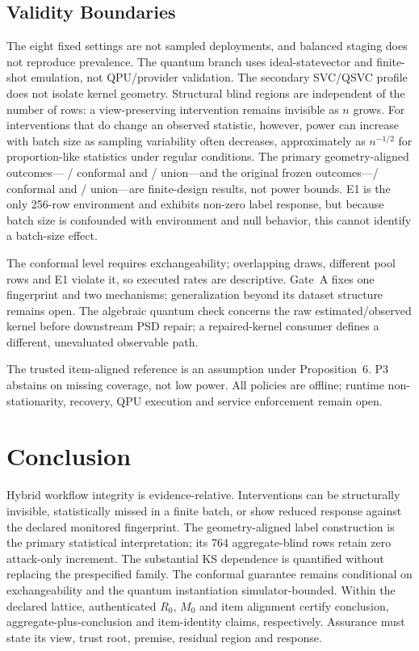 \documentclass[10pt,journal,compsoc]{IEEEtran}
\begin{document}
\subsection{Validity Boundaries}

The eight fixed settings are not sampled deployments, and balanced staging
does not reproduce prevalence. The quantum branch uses ideal-statevector and
finite-shot emulation, not QPU/provider validation. The secondary SVC/QSVC
profile does not isolate kernel geometry. Structural blind regions are
independent of the number of rows: a view-preserving intervention remains
invisible as $n$ grows. For interventions that do change an observed statistic,
however, power can increase with batch size as sampling variability often
decreases, approximately as $n^{-1/2}$ for proportion-like statistics under
regular conditions. The primary geometry-aligned outcomes---
\AlignedLabelFamilyFires{}/\AlignedLabelMaterialDen{} conformal and
\AlignedLabelUnionFires{}/\AlignedLabelMaterialDen{} union---and the original
frozen outcomes---\BatchFamilyLabelFires{}/\NMaterialLabel{} conformal and
\BatchUnionLabelFires{}/\NMaterialLabel{} union---are finite-design results,
not power bounds. E1 is the
only 256-row environment and exhibits non-zero label response, but because
batch size is confounded with environment and null behavior, this cannot
identify a batch-size effect.

The conformal level requires exchangeability; overlapping draws, different
pool rows and E1 violate it, so executed rates are descriptive. Gate~A fixes
one fingerprint and two mechanisms; generalization beyond its dataset
structure remains open. The algebraic quantum check concerns the raw
estimated/observed kernel before downstream PSD repair; a repaired-kernel
consumer defines a different, unevaluated observable path.

The trusted item-aligned reference is an assumption under Proposition~6. P3
abstains on missing coverage, not low power. All policies are offline; runtime
non-stationarity, recovery, QPU execution and service enforcement remain open.

\section{Conclusion}

Hybrid workflow integrity is evidence-relative. Interventions can be
structurally invisible, statistically missed in a finite batch, or show reduced
response against the declared monitored fingerprint. The geometry-aligned
label construction is the primary statistical interpretation; its 764
aggregate-blind rows retain zero attack-only increment. The substantial KS
dependence is quantified without replacing the prespecified family. The
conformal guarantee remains conditional on exchangeability and the quantum
instantiation simulator-bounded. Within the declared lattice, authenticated
$R_0$, $M_0$ and item alignment certify conclusion,
aggregate-plus-conclusion and item-identity claims, respectively. Assurance
must state its view, trust root, premise, residual region and response.
\end{document}
